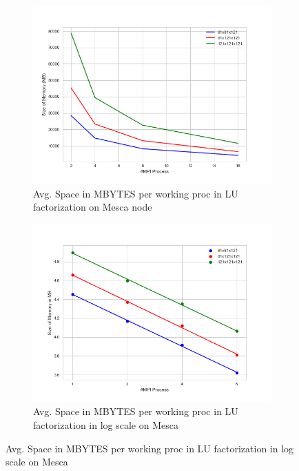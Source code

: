 \begin{figure}[!h]
\centering 
  \begin{subfigure}[b]{0.7\textwidth}
    \includegraphics[width=\textwidth]{images/memoryMescaMPI.png}
    \caption{Avg. Space in MBYTES per working proc in LU factorization on Mesca node}
    \label{memoryMescaMPI}
  \end{subfigure}
  \begin{subfigure}[b]{0.7\textwidth}
    \includegraphics[width=\textwidth]{images/MemoryMescaMPIlog.png}
    \caption{Avg. Space in MBYTES per working proc in LU factorization in log scale on Mesca}
    \label{MemoryMescaMPIlog}
  \end{subfigure}
\end{figure} 

